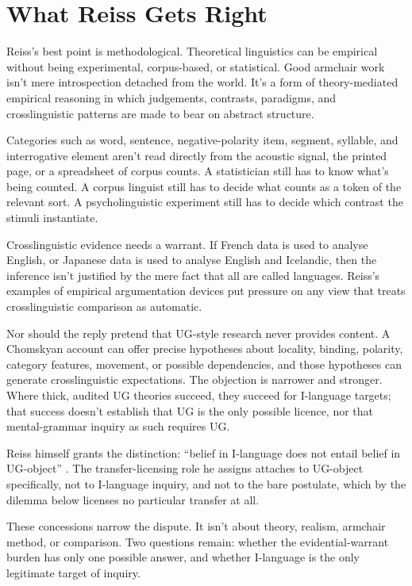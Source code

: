\documentclass[12pt]{article}
\begin{document}
\section{What Reiss Gets Right}

Reiss's best point is methodological. Theoretical linguistics can be empirical without being experimental, corpus-based, or statistical. Good armchair work isn't mere introspection detached from the world. It's a form of theory-mediated empirical reasoning in which judgements, contrasts, paradigms, and crosslinguistic patterns are made to bear on abstract structure.

Categories such as word, sentence, negative-polarity item, segment, syllable, and interrogative element aren't read directly from the acoustic signal, the printed page, or a spreadsheet of corpus counts. A statistician still has to know what's being counted. A corpus linguist still has to decide what counts as a token of the relevant sort. A psycholinguistic experiment still has to decide which contrast the stimuli instantiate.

Crosslinguistic evidence needs a warrant. If French data is used to analyse English, or Japanese data is used to analyse English and Icelandic, then the inference isn't justified by the mere fact that all are called languages. Reiss's examples of empirical argumentation devices put pressure on any view that treats crosslinguistic comparison as automatic.

Nor should the reply pretend that UG-style research never provides content. A Chomskyan account can offer precise hypotheses about locality, binding, polarity, category features, movement, or possible dependencies, and those hypotheses can generate crosslinguistic expectations. The objection is narrower and stronger. Where thick, audited UG theories succeed, they succeed for I-language targets; that success doesn't establish that UG is the only possible licence, nor that mental-grammar inquiry as such requires UG.

Reiss himself grants the distinction: \enquote{belief in I-language does not entail belief in UG-object} \citep[sec.~3]{reiss2026armchair}. The transfer-licensing role he assigns attaches to UG-object specifically, not to I-language inquiry, and not to the bare postulate, which by the dilemma below licenses no particular transfer at all.

These concessions narrow the dispute. It isn't about theory, realism, armchair method, or comparison. Two questions remain: whether the evidential-warrant burden has only one possible answer, and whether I-language is the only legitimate target of inquiry.
\end{document}
